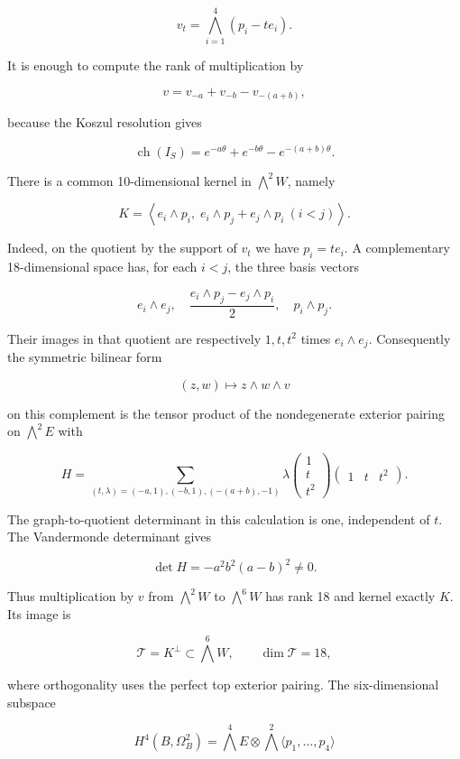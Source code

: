 \[
 v_t=\bigwedge_{i=1}^4(p_i-t e_i).
 \tag{E809.7}
\]

It is enough to compute the rank of multiplication by

\[
 v=v_{-a}+v_{-b}-v_{-(a+b)},
\]

because the Koszul resolution gives

\[
 \operatorname{ch}(I_S)=e^{-a\theta}+e^{-b\theta}-e^{-(a+b)\theta}.
 \tag{E809.8}
\]

There is a common 10-dimensional kernel in \(\bigwedge^2W\), namely

\[
 K=\left\langle e_i\wedge p_i,\;
 e_i\wedge p_j+e_j\wedge p_i\ (i<j)\right\rangle.
 \tag{E809.9}
\]

Indeed, on the quotient by the support of \(v_t\) we have \(p_i=t e_i\).
A complementary 18-dimensional space has, for each \(i<j\), the three
basis vectors

\[
 e_i\wedge e_j,\quad
 \frac{e_i\wedge p_j-e_j\wedge p_i}{2},\quad
 p_i\wedge p_j.
\]

Their images in that quotient are respectively \(1,t,t^2\) times
\(e_i\wedge e_j\). Consequently the symmetric bilinear form

\[
 (z,w)\longmapsto z\wedge w\wedge v
\]

on this complement is the tensor product of the nondegenerate exterior
pairing on \(\bigwedge^2E\) with

\[
 H=\sum_{(t,\lambda)=(-a,1),(-b,1),(-(a+b),-1)}
       \lambda\begin{pmatrix}1\\t\\t^2\end{pmatrix}
                    \begin{pmatrix}1&t&t^2\end{pmatrix}.
\]

The graph-to-quotient determinant in this calculation is one,
independent of \(t\). The Vandermonde determinant gives

\[
 \det H=-a^2b^2(a-b)^2\ne0.
 \tag{E809.10}
\]

Thus multiplication by \(v\) from \(\bigwedge^2W\) to \(\bigwedge^6W\)
has rank 18 and kernel exactly \(K\). Its image is

\[
 \mathcal T=K^\perp\subset\bigwedge^6W,
 \qquad\dim\mathcal T=18,
 \tag{E809.11}
\]

where orthogonality uses the perfect top exterior pairing. The
six-dimensional subspace

\[
 H^4(B,\Omega_B^2)=\bigwedge^4E\otimes\bigwedge^2\langle p_1,\ldots,p_4\rangle
\]

